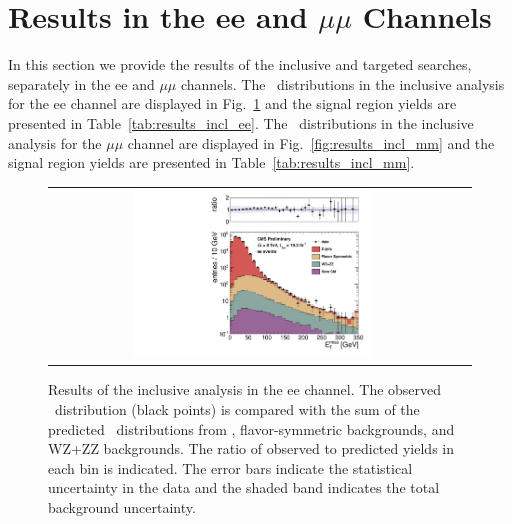 \clearpage

\section{Results in the ee and $\mu\mu$ Channels}
\label{app:results}

In this section we provide the results of the inclusive and targeted searches, separately in the ee and $\mu\mu$ channels.
The \MET\ distributions in the inclusive analysis for the ee channel are displayed in Fig.~\ref{fig:results_incl_ee} and 
the signal region yields are presented in Table~\ref{tab:results_incl_ee}.
The \MET\ distributions in the inclusive analysis for the $\mu\mu$ channel are displayed in Fig.~\ref{fig:results_incl_mm} and 
the signal region yields are presented in Table~\ref{tab:results_incl_mm}.

\begin{figure}[!h]
\begin{center}
\begin{tabular}{cc}
\includegraphics[width=0.6\textwidth]{plots/pfmet_ee_19fb.pdf}
\end{tabular}
\caption{Results of the inclusive analysis in the ee channel. The observed \MET\ distribution (black points) is compared with the sum of the predicted \MET\
distributions from \zjets, flavor-symmetric backgrounds, and WZ+ZZ backgrounds. The ratio of observed to predicted yields in each bin is
indicated. The error bars indicate the statistical uncertainty in the data and the shaded band indicates the total background uncertainty.
\label{fig:results_incl_ee}
}
\end{center}
\end{figure}

